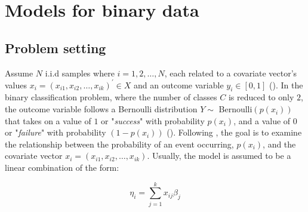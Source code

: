 

\section{Models for binary data}
\label{sec:Methods}


\subsection{Problem setting}
\label{sec:binary}

Assume $N$ i.i.d samples where $i = 1, 2, \dots, N$, each related to a covariate vector's values $x_i = (x_{i1}, x_{i2}, \dots, x_{ik})^\prime \in X$ and an outcome variable $y_i \in [0,1]$ (\cite{hastie2014}). In the binary classification problem, where the number of classes $C$ is reduced to only $2$, the outcome variable follows a Bernoulli distribution $Y \sim$ Bernoulli$(p(x_i))$ that takes on a value of $1$ or "\textit{success}" with probability $p(x_i)$, and a value of $0$ or "\textit{failure}" with probability $(1-p(x_i))$ (\cite{king2001logistic}). Following \textcite{mccullagh1989}, the goal is to examine the relationship between the probability of an event occurring, $p(x_i)$, and the covariate vector $x_i = (x_{i1}, x_{i2}, \dots, x_{ik})$. Usually, the model is assumed to be a linear combination of the form:


\begin{equation}
    \eta_i = \sum_{j=1}^{k} x_{ij} \beta_j
    \label{eqn:linear}
\end{equation}


